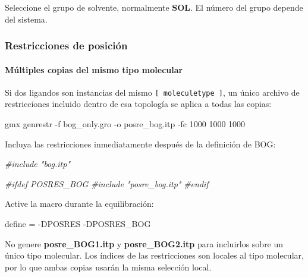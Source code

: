 \documentclass[
  spanish,
  11pt,
  a4paper]{article}
\newenvironment{Shaded}{\begin{snugshade}}{\end{snugshade}}
\newcommand{\AttributeTok}[1]{\textcolor[rgb]{0.13,0.29,0.53}{#1}}
\newcommand{\CommentTok}[1]{\textcolor[rgb]{0.56,0.35,0.01}{\textit{#1}}}
\newcommand{\DataTypeTok}[1]{\textcolor[rgb]{0.13,0.29,0.53}{#1}}
\newcommand{\ExtensionTok}[1]{#1}
\newcommand{\NormalTok}[1]{#1}
\newcommand{\OtherTok}[1]{\textcolor[rgb]{0.56,0.35,0.01}{#1}}
\newcommand{\StringTok}[1]{\textcolor[rgb]{0.31,0.60,0.02}{#1}}
\begin{document}
Seleccione el grupo de solvente, normalmente \textbf{SOL}. El número del
grupo depende del sistema.

\subsubsection{Restricciones de
posición}\label{restricciones-de-posiciuxf3n}

\paragraph{Múltiples copias del mismo tipo
molecular}\label{muxfaltiples-copias-del-mismo-tipo-molecular}

Si dos ligandos son instancias del mismo
\texttt{{[}\ moleculetype\ {]}}, un único archivo de restricciones
incluido dentro de esa topología se aplica a todas las copias:

\begin{Shaded}
\begin{Highlighting}[]
\ExtensionTok{gmx}\NormalTok{ genrestr     }\AttributeTok{{-}f}\NormalTok{ bog\_only.gro     }\AttributeTok{{-}o}\NormalTok{ posre\_bog.itp     }\AttributeTok{{-}fc}\NormalTok{ 1000 1000 1000}
\end{Highlighting}
\end{Shaded}

Incluya las restricciones inmediatamente después de la definición de
BOG:

\begin{Shaded}
\begin{Highlighting}[]
\CommentTok{\#include "bog.itp"}

\CommentTok{\#ifdef POSRES\_BOG}
\CommentTok{\#include "posre\_bog.itp"}
\CommentTok{\#endif}
\end{Highlighting}
\end{Shaded}

Active la macro durante la equilibración:

\begin{Shaded}
\begin{Highlighting}[]
\DataTypeTok{define }\OtherTok{=}\StringTok{ {-}DPOSRES {-}DPOSRES\_BOG}
\end{Highlighting}
\end{Shaded}

No genere \textbf{posre\_BOG1.itp} y \textbf{posre\_BOG2.itp} para
incluirlos sobre un único tipo molecular. Los índices de las
restricciones son locales al tipo molecular, por lo que ambas copias
usarán la misma selección local.
\end{document}
